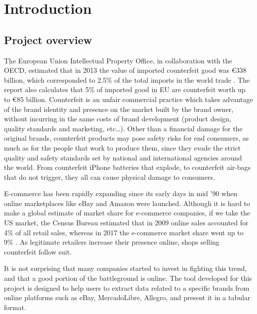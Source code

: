 \chapter{Introduction}

\section{Project overview}
The European Union Intellectual Property Office, in collaboration with the
OECD, estimated that in 2013 the value of imported counterfeit good was
\euro338 billion, which corresponded to 2.5\% of the total imports in the world
trade \cite{OE16}. The report also calculates that 5\% of imported good in EU
are counterfeit worth up to \euro85 billion. Counterfeit is an unfair commercial
practice which takes advantage of the brand identity and presence on the market built by the brand
owner, without incurring in the same costs of brand development (product design,
quality standards and marketing, etc\ldots). Other than a financial damage for the
original brands, counterfeit products may pose safety risks for end consumers,
as much as for the people that work to produce them, since they evade the strict quality
and safety standards set by national and international agencies around the
world. From counterfeit iPhone batteries that explode, to counterfeit air-bags
that do not trigger, they all can cause physical damage to consumers.

E-commerce has been rapidly expanding since its early days in mid '90 when
online marketplaces like eBay and Amazon were launched. Although it is hard to
make a global estimate of market share for e-commerce companies, if we take the
US market, the Census Bureau estimated that in 2009 online sales accounted for
4\% of all retail sales, whereas in 2017 the e-commerce market share went up to
9\% \cite{USDC18}. As legitimate retailers increase their presence online,
shops selling counterfeit follow suit.

It is not surprising that many companies started to invest in fighting this
trend, and that a good portion of the battleground is online. The tool
developed for this project is designed to help users to extract data related to
a specific brands from online platforms such as eBay, MercadoLibre, Allegro, and
present it in a tabular format.

